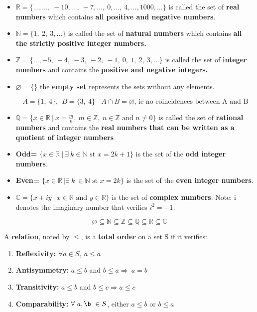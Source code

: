 \documentclass[12pt, a4paper]{book}
\begin{document}
\begin{defn}
\end{defn}
\boldmath
  \begin{itemize}
    \item $\mathbb{R}=\{ \ldots, \ldots, \ -10, \ldots, \ -7, \ldots, \ 0, \ldots, \ 4, \ldots, 1000, \ldots  \}$ is called the set of \textbf{real numbers} which contains \textbf{all positive and negative numbers}.
    \item $\mathbb{N}= \{1, \ 2 , \ 3 , \ldots \}$ is called the set of \textbf{natural numbers} which contains \textbf{all the strictly positive integer numbers.}
    \item $\mathbb{Z}= \{\ldots, -5, \ -4, \ -3, \ -2, \ -1, \ 0, \ 1, \ 2, \ 3, \ldots  \}$ is called the set of \textbf{integer numbers} and contains the \textbf{positive and negative integers.}
    \item $\varnothing = \{\}$ the \textbf{empty set} represents the sets without any elements. 
    \begin{exmp}
      \[
        A=\{1, \ 4 \}, \ \ B=\{3, \ 4 \} \ \ \ \ A \cap B= \varnothing \text{, ie no coincidences between A and B}
      \]
    \end{exmp} 
    \item $\mathbb{Q}= \{x \in \mathbb{R} \ \vert \ x= \frac{m}{n}, \ m \in \mathbb{Z}, \ n \in \mathbb{Z} \text{ and } n \neq 0 \}$ is called the set of \textbf{rational numbers} and contains the \textbf{real numbers that can be written as a quotient of integer numbers}
    \item \textbf{Odd=} $\{ x \in \mathbb{R} \ \vert \ \exists \ k \in \mathbb{N} \text{ st } x=2k+1 \}$ is the set of the \textbf{odd integer numbers}.
    \item \textbf{Even=} $\{ x \in \mathbb{R} \ \vert \exists \ k \ \in \mathbb{N} \text{ st } x=2k \}$ is the set of the \textbf{even integer numbers}.
    \item $\mathbb{C}= \{x +iy \ \vert \ x \in \mathbb{R} \text{ and } y \in \mathbb{R}  \}$ is the set of \textbf{complex numbers}. Note: i denotes the imaginary number that verifies $i^2=-1$.
  \end{itemize}
  \unboldmath

\begin{rem}
  \[
    \varnothing \subseteq \mathbb{N} \subseteq \mathbb{Z} \subseteq \mathbb{Q} \subseteq \mathbb{R} \subseteq \mathbb{C}
  \]
\end{rem}

\begin{defn}
  A \textbf{relation}, noted by $\leq $, is a \textbf{total order} on a set S if it verifies:
  \begin{enumerate}
    \item \textbf{Reflexivity:} $\forall a \in S, \ a \leq a$
    \item \textbf{Antisymmetry:} $a \leq b$ and $ b \leq a \Rightarrow \ a=b$
    \item \textbf{Transitivity:} $a \leq b$ and $b \leq c \Rightarrow a \leq c$
    \item \textbf{Comparability:} $\forall \ a, \b \ \in S$, either $a \leq b$ or $b \leq a$
  \end{enumerate}
\end{defn}
\end{document}
